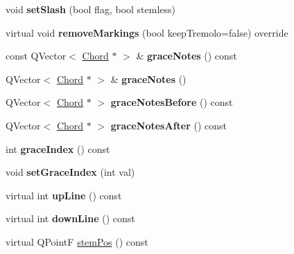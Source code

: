 \begin{DoxyCompactItemize}
void {\bfseries set\+Slash} (bool flag, bool stemless)
\item 
\mbox{\label{class_ms_1_1_chord_a6a038bc3ad9aaffdb60c449c731c3ffc}} 
virtual void {\bfseries remove\+Markings} (bool keep\+Tremolo=false) override
\item 
\mbox{\label{class_ms_1_1_chord_a60dda023bb2ac14cc6625ab7b5d711b7}} 
const Q\+Vector$<$ \hyperlink{class_ms_1_1_chord}{Chord} $\ast$ $>$ \& {\bfseries grace\+Notes} () const
\item 
\mbox{\label{class_ms_1_1_chord_a4325ce88dbfc556e818a75ec9389b887}} 
Q\+Vector$<$ \hyperlink{class_ms_1_1_chord}{Chord} $\ast$ $>$ \& {\bfseries grace\+Notes} ()
\item 
\mbox{\label{class_ms_1_1_chord_a136eb39ecfa4096dc41df49e135a5ce7}} 
Q\+Vector$<$ \hyperlink{class_ms_1_1_chord}{Chord} $\ast$ $>$ {\bfseries grace\+Notes\+Before} () const
\item 
\mbox{\label{class_ms_1_1_chord_afe552a986cb79260a7776bce05bdb6ff}} 
Q\+Vector$<$ \hyperlink{class_ms_1_1_chord}{Chord} $\ast$ $>$ {\bfseries grace\+Notes\+After} () const
\item 
\mbox{\label{class_ms_1_1_chord_af06982dd365f177a7101a32043edf665}} 
int {\bfseries grace\+Index} () const
\item 
\mbox{\label{class_ms_1_1_chord_a643e00aa9abd778e85588e422a2622d2}} 
void {\bfseries set\+Grace\+Index} (int val)
\item 
\mbox{\label{class_ms_1_1_chord_ab36bcfe7465809d082ee68bf4e31f34e}} 
virtual int {\bfseries up\+Line} () const
\item 
\mbox{\label{class_ms_1_1_chord_a1af34658e4db49b84aac36d48e3661df}} 
virtual int {\bfseries down\+Line} () const
\item 
\mbox{\label{class_ms_1_1_chord_a8b094a9d65bea81f5bb27ec52c90676b}} 
virtual Q\+PointF \hyperlink{class_ms_1_1_chord_a8b094a9d65bea81f5bb27ec52c90676b}{stem\+Pos} () const

\end{DoxyCompactItemize}
